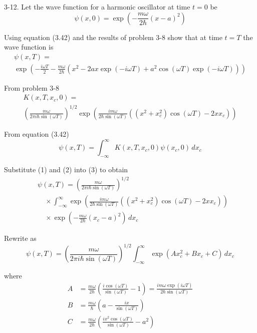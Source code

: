 \documentclass[12pt]{article}
\begin{document}
3-12.
Let the wave function for a harmonic oscillator at time $t=0$ be
\begin{equation*}
\psi(x,0)=\exp\left(-\frac{m\omega}{2\hbar}(x-a)^2\right)
\tag{1}
\end{equation*}

Using equation (3.42) and the results of problem 3-8 show that
at time $t=T$ the wave function is
\begin{multline*}
\psi(x,T)=
\\
\exp\left(
-\frac{i\omega T}{2}-\frac{m\omega}{2\hbar}
\left(x^2-2ax\exp(-i\omega T)+a^2\cos(\omega T)\exp(-i\omega T)\right)
\right)
\end{multline*}

From problem 3-8
\begin{multline*}
K(x,T,x_c,0)=
\\
\left(\frac{m\omega}{2\pi i\hbar\sin(\omega T)}\right)^{1/2}
\exp\left(
\frac{im\omega}{2\hbar\sin(\omega T)}\left((x^2+x_c^2)\cos(\omega T)-2xx_c\right)
\right)
\tag{2}
\end{multline*}

From equation (3.42)
\begin{equation*}
\psi(x,T)=\int_{-\infty}^\infty K(x,T,x_c,0)\psi(x_c,0)\,dx_c
\tag{3}
\end{equation*}

Substitute (1) and (2) into (3) to obtain
\begin{align*}
&\psi(x,T)=\left(\frac{m\omega}{2\pi i\hbar\sin(\omega T)}\right)^{1/2}
\\
&\quad{}\times\int_{-\infty}^\infty
\exp\left(
\frac{im\omega}{2\hbar\sin(\omega T)}\left((x^2+x_c^2)\cos(\omega T)-2xx_c\right)
\right)
\\
&\quad{}\times\exp\left(-\frac{m\omega}{2\hbar}(x_c-a)^2\right)\,dx_c
\end{align*}

Rewrite as
\begin{equation*}
\psi(x,T)=\left(\frac{m\omega}{2\pi i\hbar\sin(\omega T)}\right)^{1/2}
\int_{-\infty}^\infty\exp(Ax_c^2+Bx_c+C)\,dx_c
\tag{4}
\end{equation*}

where
\begin{align*}
A&=\frac{m\omega}{2\hbar}\left(\frac{i\cos(\omega T)}{\sin(\omega T)}-1\right)
=\frac{im\omega\exp(i\omega T)}{2\hbar\sin(\omega T)}
\\
B&=\frac{m\omega}{\hbar}\left(a-\frac{ix}{\sin(\omega T)}\right)
\\
C&=\frac{m\omega}{2\hbar}\left(\frac{ix^2\cos(\omega T)}{\sin(\omega T)}-a^2\right)
\end{align*}
\end{document}
